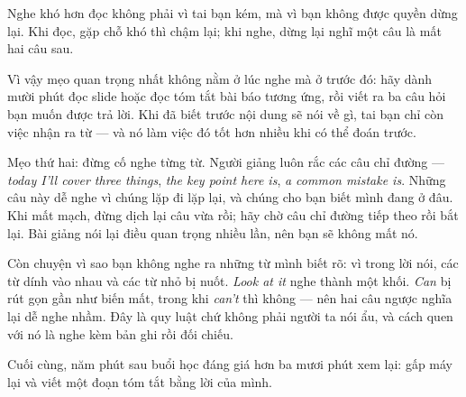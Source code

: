 \documentclass[../../english.tex]{subfiles}
\begin{document}
\begin{dongian}
Nghe khó hơn đọc không phải vì tai bạn kém, mà vì bạn không được quyền dừng lại. Khi đọc, gặp chỗ khó thì chậm lại; khi nghe, dừng lại nghĩ một câu là mất hai câu sau.

Vì vậy mẹo quan trọng nhất không nằm ở lúc nghe mà ở trước đó: hãy dành mười phút đọc slide hoặc đọc tóm tắt bài báo tương ứng, rồi viết ra ba câu hỏi bạn muốn được trả lời. Khi đã biết trước nội dung sẽ nói về gì, tai bạn chỉ còn việc nhận ra từ --- và nó làm việc đó tốt hơn nhiều khi có thể đoán trước.

Mẹo thứ hai: đừng cố nghe từng từ. Người giảng luôn rắc các câu chỉ đường --- \emph{today I'll cover three things}, \emph{the key point here is}, \emph{a common mistake is}. Những câu này dễ nghe vì chúng lặp đi lặp lại, và chúng cho bạn biết mình đang ở đâu. Khi mất mạch, đừng dịch lại câu vừa rồi; hãy chờ câu chỉ đường tiếp theo rồi bắt lại. Bài giảng nói lại điều quan trọng nhiều lần, nên bạn sẽ không mất nó.

Còn chuyện vì sao bạn không nghe ra những từ mình biết rõ: vì trong lời nói, các từ dính vào nhau và các từ nhỏ bị nuốt. \emph{Look at it} nghe thành một khối. \emph{Can} bị rút gọn gần như biến mất, trong khi \emph{can't} thì không --- nên hai câu ngược nghĩa lại dễ nghe nhầm. Đây là quy luật chứ không phải người ta nói ẩu, và cách quen với nó là nghe kèm bản ghi rồi đối chiếu.

Cuối cùng, năm phút sau buổi học đáng giá hơn ba mươi phút xem lại: gấp máy lại và viết một đoạn tóm tắt bằng lời của mình.
\end{dongian}
\end{document}

